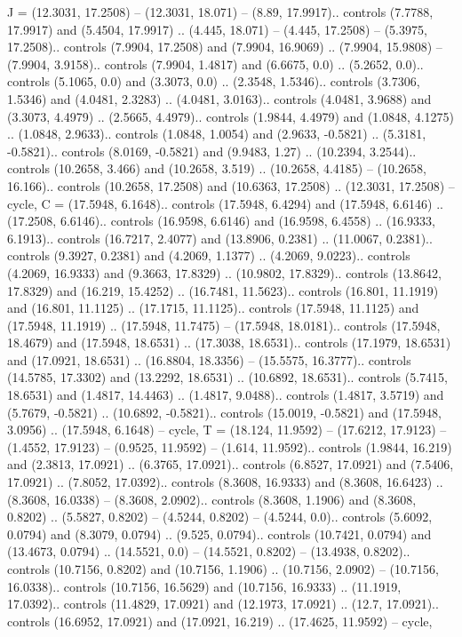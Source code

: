 {J} = {(12.3031, 17.2508) -- (12.3031, 18.071) -- (8.89, 17.9917).. controls (7.7788, 17.9917) and (5.4504, 17.9917) .. (4.445, 18.071) -- (4.445, 17.2508) -- (5.3975, 17.2508).. controls (7.9904, 17.2508) and (7.9904, 16.9069) .. (7.9904, 15.9808) -- (7.9904, 3.9158).. controls (7.9904, 1.4817) and (6.6675, 0.0) .. (5.2652, 0.0).. controls (5.1065, 0.0) and (3.3073, 0.0) .. (2.3548, 1.5346).. controls (3.7306, 1.5346) and (4.0481, 2.3283) .. (4.0481, 3.0163).. controls (4.0481, 3.9688) and (3.3073, 4.4979) .. (2.5665, 4.4979).. controls (1.9844, 4.4979) and (1.0848, 4.1275) .. (1.0848, 2.9633).. controls (1.0848, 1.0054) and (2.9633, -0.5821) .. (5.3181, -0.5821).. controls (8.0169, -0.5821) and (9.9483, 1.27) .. (10.2394, 3.2544).. controls (10.2658, 3.466) and (10.2658, 3.519) .. (10.2658, 4.4185) -- (10.2658, 16.166).. controls (10.2658, 17.2508) and (10.6363, 17.2508) .. (12.3031, 17.2508) -- cycle},
{C} = {(17.5948, 6.1648).. controls (17.5948, 6.4294) and (17.5948, 6.6146) .. (17.2508, 6.6146).. controls (16.9598, 6.6146) and (16.9598, 6.4558) .. (16.9333, 6.1913).. controls (16.7217, 2.4077) and (13.8906, 0.2381) .. (11.0067, 0.2381).. controls (9.3927, 0.2381) and (4.2069, 1.1377) .. (4.2069, 9.0223).. controls (4.2069, 16.9333) and (9.3663, 17.8329) .. (10.9802, 17.8329).. controls (13.8642, 17.8329) and (16.219, 15.4252) .. (16.7481, 11.5623).. controls (16.801, 11.1919) and (16.801, 11.1125) .. (17.1715, 11.1125).. controls (17.5948, 11.1125) and (17.5948, 11.1919) .. (17.5948, 11.7475) -- (17.5948, 18.0181).. controls (17.5948, 18.4679) and (17.5948, 18.6531) .. (17.3038, 18.6531).. controls (17.1979, 18.6531) and (17.0921, 18.6531) .. (16.8804, 18.3356) -- (15.5575, 16.3777).. controls (14.5785, 17.3302) and (13.2292, 18.6531) .. (10.6892, 18.6531).. controls (5.7415, 18.6531) and (1.4817, 14.4463) .. (1.4817, 9.0488).. controls (1.4817, 3.5719) and (5.7679, -0.5821) .. (10.6892, -0.5821).. controls (15.0019, -0.5821) and (17.5948, 3.0956) .. (17.5948, 6.1648) -- cycle},
{T} = {(18.124, 11.9592) -- (17.6212, 17.9123) -- (1.4552, 17.9123) -- (0.9525, 11.9592) -- (1.614, 11.9592).. controls (1.9844, 16.219) and (2.3813, 17.0921) .. (6.3765, 17.0921).. controls (6.8527, 17.0921) and (7.5406, 17.0921) .. (7.8052, 17.0392).. controls (8.3608, 16.9333) and (8.3608, 16.6423) .. (8.3608, 16.0338) -- (8.3608, 2.0902).. controls (8.3608, 1.1906) and (8.3608, 0.8202) .. (5.5827, 0.8202) -- (4.5244, 0.8202) -- (4.5244, 0.0).. controls (5.6092, 0.0794) and (8.3079, 0.0794) .. (9.525, 0.0794).. controls (10.7421, 0.0794) and (13.4673, 0.0794) .. (14.5521, 0.0) -- (14.5521, 0.8202) -- (13.4938, 0.8202).. controls (10.7156, 0.8202) and (10.7156, 1.1906) .. (10.7156, 2.0902) -- (10.7156, 16.0338).. controls (10.7156, 16.5629) and (10.7156, 16.9333) .. (11.1919, 17.0392).. controls (11.4829, 17.0921) and (12.1973, 17.0921) .. (12.7, 17.0921).. controls (16.6952, 17.0921) and (17.0921, 16.219) .. (17.4625, 11.9592) -- cycle},
